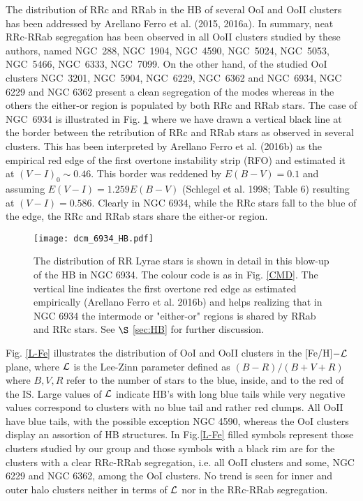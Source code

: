 \documentclass[journal]{rmaa}
\newcommand{\1}{\'{\i}}
\begin{document}
The distribution of RRc and RRab in the HB of several OoI and OoII clusters has been
addressed by Arellano Ferro et al. (2015, 2016a). In summary, neat RRc-RRab
segregation has been observed in all OoII clusters studied by these authors, named
NGC~288, NGC~1904, NGC~4590, NGC~5024, NGC~5053,  NGC~5466, NGC~6333, NGC~7099. On the
other hand, of the studied OoI clusters NGC~3201, NGC~5904, NGC~6229, NGC~6362 and
NGC~6934, NGC 6229 and NGC 6362 present a clean segregation of the modes whereas in
the others the either-or region is populated by both RRc and RRab stars. The case of
NGC~6934 is
illustrated in Fig. \ref{HB} where we have drawn a vertical black line at the border
between the retribution of RRc and RRab stars as observed in several clusters.
This has been interpreted by Arellano Ferro et al. (2016b) as the empirical
red edge of the first overtone instability strip (RFO) and estimated it at $(V-I)_0
\sim 0.46$.
This border was reddened by $E(B-V)=0.1$ and assuming $E(V-I)= 1.259 E(B-V)$
(Schlegel et al. 1998; Table 6) resulting at $(V-I)= 0.586$. Clearly in NGC 6934,
while the RRc stars fall to the blue of the edge, the RRc and RRab stars share the
either-or region.

\begin{figure*}
\begin{center}
\texttt{[image: dcm\_6934\_HB.pdf]}
\caption{The distribution of RR Lyrae stars is shown in detail in this blow-up of the
HB in NGC 6934. The colour code is as in Fig. \ref{CMD}. The vertical line
indicates the first overtone red edge as estimated empirically (Arellano Ferro et al.
2016b) and helps realizing that in NGC 6934 the intermode or "either-or" regions
is shared by RRab and RRc stars. See $\S$ \ref{sec:HB} for further discussion.}
\label{HB}
\end{center}
\end{figure*}

Fig. \ref{L-Fe} illustrates the distribution of OoI and OoII clusters in the
[Fe/H]$-\cal L$ plane, where $\cal L$ is the Lee-Zinn parameter defined as
$(B-R)/(B+V+R)$ where $B,V,R$ refer to the number of stars to the blue, inside, and to
the red of the IS. Large values of $\cal L$ indicate HB's with long blue tails while
very negative values correspond to clusters with no blue tail and rather red clumps.
All OoII have blue tails, with the possible exception NGC 4590, whereas the OoI
clusters display an assortion of HB structures. In Fig.\ref{L-Fe} filled symbols
represent those clusters studied by our group and those symbols with a black rim are
for the clusters with a clear RRc-RRab segregation, i.e. all OoII clusters and some,
NGC 6229 and NGC 6362, among the OoI clusters. No trend is seen for inner and outer halo
clusters neither in terms of $\cal L$ nor in the RRc-RRab segregation.
\end{document}
